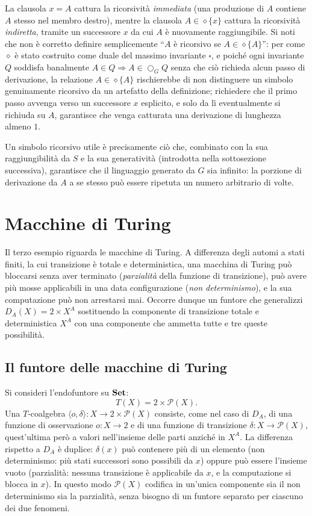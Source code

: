 La clausola \(x = A\) cattura la ricorsività \textit{immediata} (una produzione di \(A\) contiene \(A\) stesso nel membro destro), mentre la clausola \(A \in \diamond\{x\}\) cattura la ricorsività \textit{indiretta}, tramite un successore \(x\) da cui \(A\) è nuovamente raggiungibile. Si noti che non è corretto definire semplicemente ``\(A\) è ricorsivo se \(A \in \diamond\{A\}\)'': per come \(\diamond\) è stato costruito come duale del massimo invariante \(\square\), e poiché ogni invariante \(Q\) soddisfa banalmente \(A \in Q \Rightarrow A \in \bigcirc_G Q\) senza che ciò richieda alcun passo di derivazione, la relazione \(A \in \diamond\{A\}\) rischierebbe di non distinguere un simbolo genuinamente ricorsivo da un artefatto della definizione; richiedere che il primo passo avvenga verso un successore \(x\) esplicito, e solo da lì eventualmente si richiuda su \(A\), garantisce che venga catturata una derivazione di lunghezza almeno \(1\).

Un simbolo ricorsivo utile è precisamente ciò che, combinato con la sua raggiungibilità da \(S\) e la sua generatività (introdotta nella sottosezione successiva), garantisce che il linguaggio generato da \(G\) sia infinito: la porzione di derivazione da \(A\) a se stesso può essere ripetuta un numero arbitrario di volte.

\section{Macchine di Turing}
 
Il terzo esempio riguarda le macchine di Turing. A differenza degli automi a stati finiti, la cui transizione è totale e deterministica, una macchina di Turing può bloccarsi senza aver terminato (\textit{parzialità} della funzione di transizione), può avere più mosse applicabili in una data configurazione (\textit{non determinismo}), e la sua computazione può non arrestarsi mai. Occorre dunque un funtore che generalizzi \(D_A(X) = 2 \times X^A\) sostituendo la componente di transizione totale e deterministica \(X^A\) con una componente che ammetta tutte e tre queste possibilità.
 
\subsection{Il funtore delle macchine di Turing}
 
Si consideri l'endofuntore su \(\operatorname{\mathbf{Set}}\):
\[
  T(X) = 2 \times \mathcal{P}(X).
\]
Una \(T\)-coalgebra \(\langle o, \delta \rangle : X \to 2 \times \mathcal{P}(X)\) consiste, come nel caso di \(D_A\), di una funzione di osservazione \(o : X \to 2\) e di una funzione di transizione \(\delta : X \to \mathcal{P}(X)\), quest'ultima però a valori nell'insieme delle parti anziché in \(X^A\). La differenza rispetto a \(D_A\) è duplice: \(\delta(x)\) può contenere più di un elemento (non determinismo: più stati successori sono possibili da \(x\)) oppure può essere l'insieme vuoto (parzialità: nessuna transizione è applicabile da \(x\), e la computazione si blocca in \(x\)). In questo modo \(\mathcal{P}(X)\) codifica in un'unica componente sia il non determinismo sia la parzialità, senza bisogno di un funtore separato per ciascuno dei due fenomeni.
 
